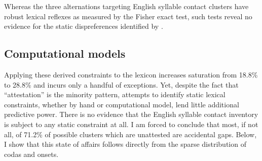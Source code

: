 Whereas the three alternations targeting English syllable contact clusters have robust lexical reflexes as measured by the Fisher exact test, such tests reveal no evidence for the static dispreferences identified by \citeauthor{Pierrehumbert1994}.

%
%

\subsection{Computational models}

Applying these derived constraints to the lexicon increases saturation from 18.8\% to 28.8\% and incurs only a handful of exceptions. Yet, despite the fact that ``attestation'' is the minority pattern, attempts to identify static lexical constraints, whether by hand or computational model, lend little additional predictive power. There is no evidence that the English syllable contact inventory is subject to any static constraint at all. I am forced to conclude that most, if not all, of 71.2\% of possible clusters which are unattested are accidental gaps. Below, I show that this state of affairs follows directly from the sparse distribution of codas and onsets. 

